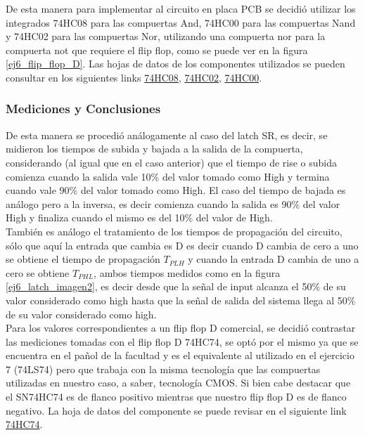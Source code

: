 %
\noindent
De esta manera para implementar al circuito en placa PCB se decidió utilizar los integrados 74HC08 para las compuertas And, 74HC00 para las compuertas Nand y 74HC02 para las compuertas Nor, utilizando una compuerta nor para la compuerta not que requiere el flip flop, como se puede ver en la figura \ref{ej6_flip_flop_D}. Las hojas de datos de los componentes utilizados se pueden consultar en los siguientes links \href{http://www.ti.com/lit/ds/symlink/sn74hc08.pdf}{74HC08}, \href{http://www.ti.com/lit/ds/symlink/sn74hc02.pdf}{74HC02}, \href{http://www.ti.com/lit/ds/symlink/sn74hc00.pdf}{74HC00}.
%

\subsubsection{Mediciones y Conclusiones}
\noindent
De esta manera se procedió análogamente al caso del latch SR, es decir, se midieron los tiempos de subida y bajada a la salida de la compuerta, considerando (al igual que en el caso anterior) que el tiempo de rise o subida comienza cuando la salida vale 10\% del valor tomado como High y termina cuando vale 90\% del valor tomado como High. El caso del tiempo de bajada es análogo pero a la inversa, es decir comienza cuando la salida es 90\% del valor High y finaliza cuando el mismo es del 10\% del valor de High.\\
%
También es análogo el tratamiento de los tiempos de propagación del circuito, sólo que aquí la entrada que cambia es D es decir cuando D cambia de cero a uno se obtiene el tiempo de propagación $T_{PLH}$ y cuando la entrada D cambia de uno a cero se obtiene $T_{PHL}$, ambos tiempos medidos como en la figura \ref{ej6_latch_imagen2}, es decir desde que la señal de input alcanza el 50\% de su valor considerado como high hasta que la señal de salida del sistema llega al 50\% de su valor considerado como high.\\
%
Para los valores correspondientes a un flip flop D comercial, se decidió contrastar las mediciones tomadas con el flip flop D 74HC74, se optó por el mismo ya que se encuentra en el pañol de la facultad y es el equivalente al utilizado en el ejercicio 7 (74LS74) pero que trabaja con la misma tecnología que las compuertas utilizadas en nuestro caso, a saber, tecnología CMOS. Si bien cabe destacar que el SN74HC74 es de flanco positivo mientras que nuestro flip flop D es de flanco negativo. La hoja de datos del componente se puede revisar en el siguiente link \href{http://www.ti.com/lit/ds/symlink/sn74hc74-ep.pdf}{74HC74}.\\
